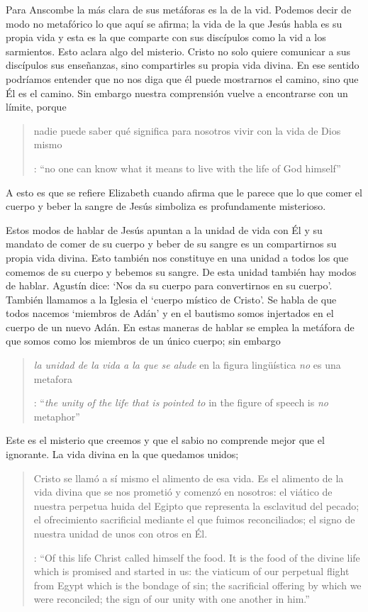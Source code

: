 Para Anscombe la más clara de sus metáforas es la de la vid. Podemos decir de modo no metafórico lo que aquí se afirma; la vida de la que Jesús habla es su propia vida y esta es la que comparte con sus discípulos como la vid a los sarmientos. Esto aclara algo del misterio. Cristo no solo quiere comunicar a sus discípulos sus enseñanzas, sino compartirles su propia vida divina. En ese sentido podríamos entender que no nos diga que él puede mostrarnos el camino, sino que Él es el camino. Sin embargo nuestra comprensión vuelve a encontrarse con un límite, porque \blockquote[{\cite[110]{anscombe1981erp:ot}}: \enquote{no one can know what it means to live with the life of God himself}]{nadie puede saber qué significa para nosotros vivir con la vida de Dios mismo}. A esto es que se refiere Elizabeth cuando afirma que le parece que lo que comer el cuerpo y beber la sangre de Jesús simboliza es profundamente misterioso.

Estos modos de hablar de Jesús apuntan a la unidad de vida con Él y su mandato de comer de su cuerpo y beber de su sangre es un compartirnos su propia vida divina. Esto también nos constituye en una unidad a todos los que comemos de su cuerpo y bebemos su sangre. De esta unidad también hay modos de hablar. Agustín dice: \enquote*{Nos da su cuerpo para convertirnos en su cuerpo}. También llamamos a la Iglesia el \enquote*{cuerpo místico de Cristo}. Se habla de que todos nacemos \enquote*{miembros de Adán} y en el bautismo somos injertados en el cuerpo de un nuevo Adán. En estas maneras de hablar se emplea la metáfora de que somos como los miembros de un único cuerpo; sin embargo \blockquote[{\cite[112]{anscombe1981erp:ot}}: \enquote{\emph{the unity of the life that is pointed to} in the figure of speech is \emph{no} metaphor}]{\emph{la unidad de la vida a la que se alude} en la figura lingüística \emph{no} es una metafora}.

Este es el misterio que creemos y que el sabio no comprende mejor que el ignorante. La vida divina en la que quedamos unidos; \blockquote[{\cite[112]{anscombe1981erp:ot}}: \enquote{Of this life Christ called himself the food. It is the food of the divine life which is promised and started in us: the viaticum of our perpetual flight from Egypt which is the bondage of sin; the sacrificial offering by which we were reconciled; the sign of our unity with one another in him.}]{Cristo se llamó a sí mismo el alimento de esa vida. Es el alimento de la vida divina que se nos prometió y comenzó en nosotros: el viático de nuestra perpetua huida del Egipto que representa la esclavitud del pecado; el ofrecimiento sacrificial mediante el que fuimos reconciliados; el signo de nuestra unidad de unos con otros en Él.}
